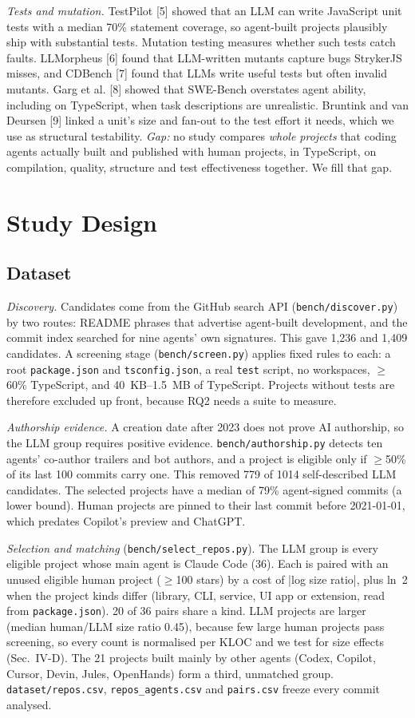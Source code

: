 \documentclass[10pt,conference]{IEEEtran}
\begin{document}
\emph{Tests and mutation.} TestPilot [5] showed that an LLM can write JavaScript unit tests with a median 70\% statement coverage, so agent-built projects plausibly ship with substantial tests. Mutation testing measures whether such tests catch faults. LLMorpheus [6] found that LLM-written mutants capture bugs StrykerJS misses, and CDBench [7] found that LLMs write useful tests but often invalid mutants. Garg et al. [8] showed that SWE-Bench overstates agent ability, including on TypeScript, when task descriptions are unrealistic. Bruntink and van Deursen [9] linked a unit's size and fan-out to the test effort it needs, which we use as structural testability. \emph{Gap:} no study compares \emph{whole projects} that coding agents actually built and published with human projects, in TypeScript, on compilation, quality, structure and test effectiveness together. We fill that gap.

\section{Study Design}
\subsection{Dataset}
\emph{Discovery.} Candidates come from the GitHub search API (\texttt{bench/discover.py}) by two routes: README phrases that advertise agent-built development, and the commit index searched for nine agents' own signatures. This gave 1,236 and 1,409 candidates. A screening stage (\texttt{bench/screen.py}) applies fixed rules to each: a root \texttt{package.json} and \texttt{tsconfig.json}, a real \texttt{test} script, no workspaces, $\geq$60\% TypeScript, and 40~KB--1.5~MB of TypeScript. Projects without tests are therefore excluded up front, because RQ2 needs a suite to measure.

\emph{Authorship evidence.} A creation date after 2023 does not prove AI authorship, so the LLM group requires positive evidence. \texttt{bench/authorship.py} detects ten agents' co-author trailers and bot authors, and a project is eligible only if $\geq$50\% of its last 100 commits carry one. This removed 779 of 1014 self-described LLM candidates. The selected projects have a median of 79\% agent-signed commits (a lower bound). Human projects are pinned to their last commit before 2021-01-01, which predates Copilot's preview and ChatGPT.

\emph{Selection and matching} (\texttt{bench/select\_repos.py}). The LLM group is every eligible project whose main agent is Claude Code (36). Each is paired with an unused eligible human project ($\geq$100 stars) by a cost of |log size ratio|, plus ln~2 when the project kinds differ (library, CLI, service, UI app or extension, read from \texttt{package.json}). 20 of 36 pairs share a kind. LLM projects are larger (median human/LLM size ratio 0.45), because few large human projects pass screening, so every count is normalised per KLOC and we test for size effects (Sec.~IV-D). The 21 projects built mainly by other agents (Codex, Copilot, Cursor, Devin, Jules, OpenHands) form a third, unmatched group. \texttt{dataset/repos.csv}, \texttt{repos\_agents.csv} and \texttt{pairs.csv} freeze every commit analysed.
\end{document}
